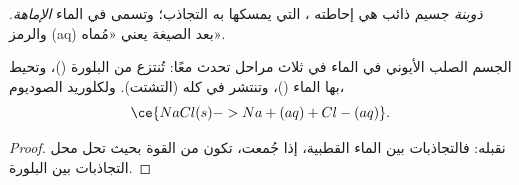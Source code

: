 \begin{definition}\label{def:g11:dissolution:solvation}
\emph{ذوبنة} جسيم ذائب هي إحاطته  ، التي يمسكها به
التجاذب؛ وتسمى في الماء \emph{الإماهة}. والرمز (aq) بعد الصيغة
يعني «مُماه».
\end{definition}

\begin{proposition}\label{prop:g11:dissolution:stages}
 الجسم الصلب الأيوني في الماء في ثلاث مراحل تحدث معًا: تُنتزع  من
البلورة ()، وتحيط بها  الماء ()، وتنتشر في  كله
(التشتت). ولكلوريد الصوديوم،
\[
  \ce{NaCl(s) -> Na+(aq) + Cl-(aq)} .
\]
\end{proposition}

\begin{proof}
نقبله: فالتجاذبات بين   الماء القطبية، إذا جُمعت، تكون من القوة
بحيث تحل محل التجاذبات بين  البلورة.
\end{proof}

